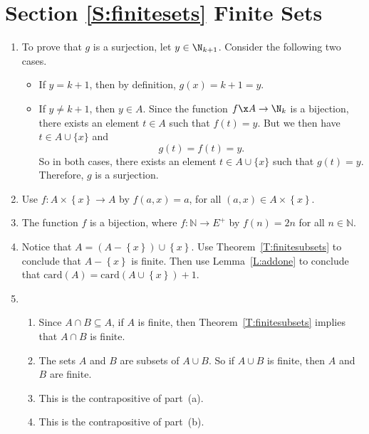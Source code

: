 \section*{Section \ref{S:finitesets} Finite Sets}

\begin{enumerate}
\item To prove that $g$ is a surjection, let $y \in \N_{k+1}$.  Consider the following two cases.
\begin{itemize}
\item If $y = k +1$, then by definition, $g(x) = k + 1 = y$.

\item If $y \ne k + 1$, then $y \in A$.  Since the function $f\x A \to \N_k$ is a bijection, there exists an element $t \in A$ such that $f(t) = y$.  But we then have $t \in A \cup \{ x \}$ and
\[
g(t) = f(t) = y.
\]
So in both cases, there exists an element $t \in A \cup \{ x \}$ such that $g(t) = y$.  Therefore, $g$ is a surjection. 
\end{itemize}


\item Use $f: A \times \left\{ x \right\} \to A$ by $f \left( a, x \right) = a$, for all 
$\left( a, x \right) \in A \times \left\{ x \right\}$.

\item The function $f$ is a bijection, where $f: \mathbb{N} \to E^+$ by $f \left( n \right) = 2n$ for all $n \in \mathbb{N}$.

\item Notice that $A = \left( A - \left\{ x \right\} \right) \cup \left\{x \right\}$.  Use 
Theorem~\ref{T:finitesubsets} to conclude that $A - \left\{ x \right\}$ is finite.  Then use 
Lemma~\ref{L:addone} to conclude that 
$\text{card} \left( A \right) = \text{card} \left( A \cup \left\{ x \right\} \right) + 1$.

\item \begin{enumerate}
\item Since $A \cap B \subseteq A$, if $A$ is finite, then Theorem~\ref{T:finitesubsets} implies that $A \cap B$ is finite.

\item The sets $A$ and $B$ are subsets of $A \cup B$.  So if $A \cup B$ is finite, then $A$ and $B$ are finite.

\item This is the contrapositive of part~(a).

\item This is the contrapositive of part~(b).
\end{enumerate}


\end{enumerate}
